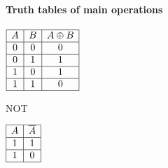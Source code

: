 \documentclass{beamer}
\newenvironment{namedframe}[1]%
	{\begin{frame}\frametitle{\secname}\framesubtitle{#1}}
	{\end{frame}}
\newcommand{\xor}{\oplus}
\newcommand{\negate}[1]{\overline{#1}}
\begin{document}
\begin{namedframe}{Truth tables of main operations}
\begin{center}
\begin{minipage}[t]{0.45\textwidth}
\begin{table}
\begin{math}
						\begin{array}{|c|c|c|}
							\hline
							A & B & A \xor B\\\hline
							0 & 0 & 0\\\hline
							0 & 1 & 1\\\hline
							1 & 0 & 1\\\hline
							1 & 1 & 0\\\hline
						\end{array}
					\end{math}
				\end{table}
				\vspace{\baselineskip}
				\pause
				\begin{table}
					\caption{NOT}
					\begin{math}
						\begin{array}{|c|c|}
							\hline
							A & \negate{A}\\\hline
							1 & 1\\\hline
							1 & 0\\\hline
						\end{array}
					\end{math}
				\end{table}
			\end{minipage}
		\end{center}
	\end{namedframe}
\end{document}
